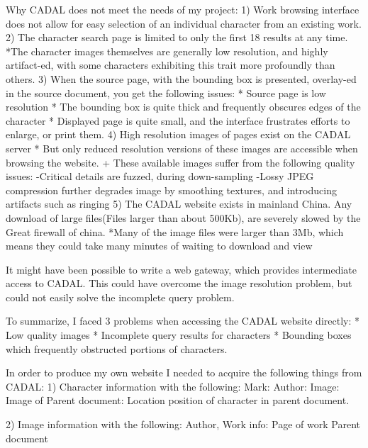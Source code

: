     Why CADAL does not meet the needs of my project:
        1)  Work browsing interface does not allow for easy selection of an individual character from an existing work.
        2)  The character search page is limited to only the first 18 results at any time.
            *The character images themselves are generally low resolution, and highly artifact-ed, with some characters exhibiting this trait more profoundly than others.
        3)  When the source page, with the bounding box is presented, overlay-ed in the source document, you get the following issues:
            *  Source page is low resolution
            *  The bounding box is quite thick and frequently obscures edges of the character
            *  Displayed page is quite small, and the interface frustrates efforts to enlarge, or print them.
        4)  High resolution images of pages exist on the CADAL server
            * But only reduced resolution versions of these images are accessible when browsing the website.
                + These available images suffer from the following quality issues:
                    -Critical details are fuzzed, during down-sampling
                    -Lossy JPEG compression further degrades image by smoothing textures, and introducing artifacts such as ringing
        5)  The CADAL website exists in mainland China.  Any download of large files(Files larger than about 500Kb), are severely slowed by the Great firewall of china.
            *Many of the image files were larger than 3Mb, which means they could take many minutes of waiting to download and view
        
        
    It might have been possible to write a web gateway, which provides intermediate access to CADAL.  This could have overcome the image resolution problem, but could not easily solve the incomplete query problem.
    
    To summarize, I faced 3 problems when accessing the CADAL website directly:
        *  Low quality images
        *  Incomplete query results for characters
        *  Bounding boxes which frequently obstructed portions of characters.
                    



    In order to produce my own website I needed to acquire the following things from CADAL:
        1)  Character information with the following:
            Mark:
            Author:
            Image:
            Image of Parent document:
            Location position of character in parent document.
        
        2)  Image information with the following:
            Author,
            Work info:
                Page of work
                Parent document
            
